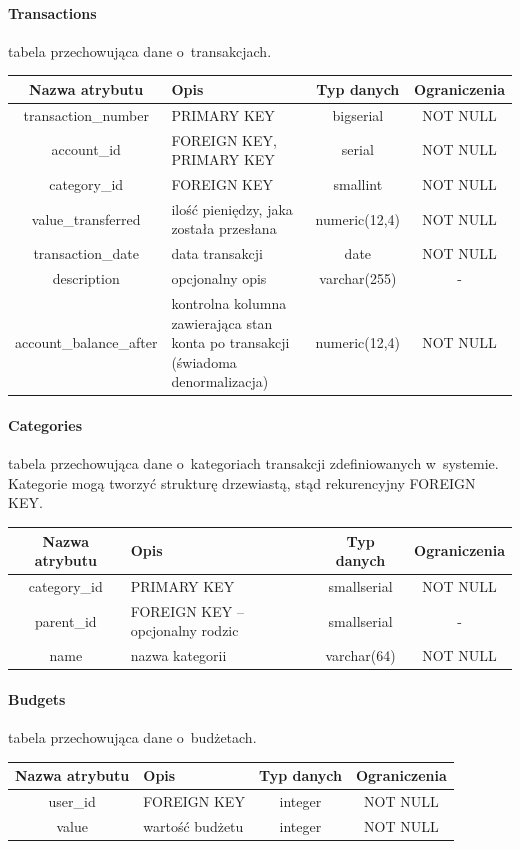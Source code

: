 \newpage
\paragraph{Transactions} tabela przechowująca dane o~transakcjach.\\

\begin{tabular}{| c | p{4cm} | c | c |}
  \hline \textbf{Nazwa atrybutu} & \textbf{Opis} & \textbf{Typ danych} & \textbf{Ograniczenia} \\ \hline
  transaction\_number & PRIMARY KEY & bigserial & NOT NULL \\ \hline
  account\_id & FOREIGN KEY, PRIMARY KEY & serial & NOT NULL \\ \hline
  category\_id & FOREIGN KEY & smallint & NOT NULL \\ \hline
  value\_transferred & ilość pieniędzy, jaka została przesłana  & numeric(12,4)  & NOT NULL \\ \hline
  transaction\_date & data transakcji & date  & NOT NULL \\ \hline
  description & opcjonalny opis & varchar(255) & - \\ \hline
  account\_balance\_after & kontrolna kolumna zawierająca stan konta po transakcji (świadoma denormalizacja) & numeric(12,4) & NOT NULL \\ \hline
\end{tabular}

\paragraph{Categories} tabela przechowująca dane o~kategoriach transakcji zdefiniowanych w~systemie. Kategorie mogą tworzyć strukturę drzewiastą, stąd rekurencyjny FOREIGN KEY.\\

\begin{tabular}{| c | p{4cm} | c | c |}
  \hline \textbf{Nazwa atrybutu} & \textbf{Opis} & \textbf{Typ danych} & \textbf{Ograniczenia} \\ \hline
  category\_id & PRIMARY KEY & smallserial & NOT NULL \\ \hline
  parent\_id & FOREIGN KEY -- opcjonalny rodzic & smallserial & - \\ \hline
  name & nazwa kategorii & varchar(64) & NOT NULL \\ \hline
\end{tabular}

\paragraph{Budgets} tabela przechowująca dane o~budżetach.\\

\begin{tabular}{| c | p{4cm} | c | c |}
  \hline \textbf{Nazwa atrybutu} & \textbf{Opis} & \textbf{Typ danych} & \textbf{Ograniczenia} \\ \hline
  user\_id & FOREIGN KEY & integer & NOT NULL \\ \hline
  value & wartość budżetu & integer & NOT NULL \\ \hline
\end{tabular}

